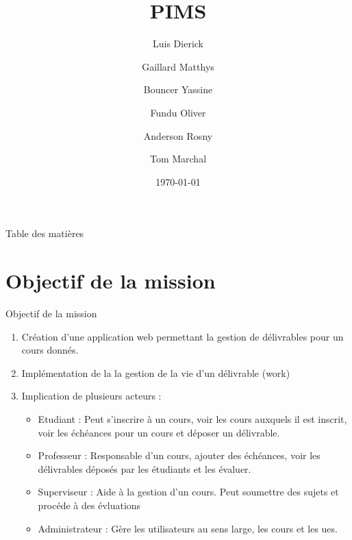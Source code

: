 \documentclass[numbering=fraction,10pt]{beamer}
\title{PIMS}
\author[PIMS]{Luis Dierick \and Gaillard Matthys \and Bouncer Yassine \and Fundu Oliver \and Anderson Rosny \and Tom Marchal }
\institute{Université de Namur}
\date{\today}
\begin{document}
\begin{frame}[plain]{}
    \maketitle
\end{frame}

\begin{frame}{Table des matières}
    \tableofcontents
\end{frame}
\section{Objectif de la mission}
\begin{frame}{Objectif de la mission}
    \begin{enumerate}
        \item Création d'une application web permettant la gestion de délivrables pour un cours donnés.
        \item Implémentation de la la gestion de la vie d'un délivrable (work)
        \item Implication de plusieurs acteurs : 
        \begin{itemize}
            \item Etudiant : Peut s'inscrire à un cours, voir les cours auxquels il est inscrit, voir les échéances pour un cours et déposer un délivrable.
            \item Professeur : Responsable d'un cours, ajouter des échéances, voir les délivrables déposés par les étudiants et les évaluer.
            \item Superviseur : Aide à la gestion d'un cours. Peut soumettre des sujets et procéde à des évluations
            \item Administrateur : Gère les utilisateurs au sens large, les cours et les ues.
        \end{itemize}
    \end{enumerate}
\end{frame}
\end{document}
